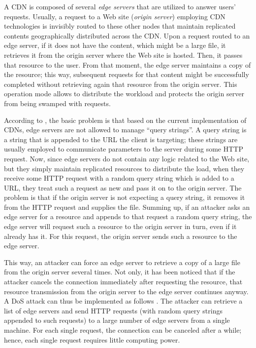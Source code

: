 \documentclass{IEEEtran}
\begin{document}
A CDN is composed of several \emph{edge servers} that are utilized to answer users' requests. Usually, a request to a Web site (\emph{origin server}) employing CDN technologies is invisibly routed to these other nodes that maintain replicated contents geographically distributed across the CDN. Upon a request routed to an edge server, if it does not have the content, which might be a large file, it retrieves it from the origin server where the Web site is hosted. Then, it passes that resource to the user. From that moment, the edge server maintains a copy of the resource; this way, subsequent requests for that content might be successfully completed without retrieving again that resource from the origin server. This operation mode allows to distribute the workload and protects the origin server from being swamped with requests.

According to \cite{original}, the basic problem is that based on the current implementation of CDNs, edge servers are not allowed to manage ``query strings''.
A query string is a string that is appended to the URL the client is targeting; these strings are usually employed to communicate parameters to the server during some HTTP request.
Now, since edge servers do not contain any logic related to the Web site, but they simply maintain replicated resources to distribute the load, when they receive some HTTP request with a random query string which is added to a URL, they treat such a request as new and pass it on to the origin server. 
The problem is that if the origin server is not expecting a query string, it removes it from the HTTP request and supplies the file. Summing up, if an attacker asks an edge server for a resource and appends to that request a random query string, the edge server will request such a resource to the origin server in turn, even if it already has it. For this request, the origin server sends such a resource to the edge server.

This way, an attacker can force an edge server to retrieve a copy of a large file from the origin server several times. Not only, it has been noticed that if the attacker cancels the connection immediately after requesting the resource, that resource transmission from the origin server to the edge server continues anyway.
A DoS attack can thus be implemented as follows \cite{original}. The attacker can retrieve a list of edge servers and send HTTP requests (with random query strings appended to such requests) to a large number of edge servers from a single machine. For each single request, the connection can be canceled after a while; hence, each single request requires little computing power. 
\end{document}

